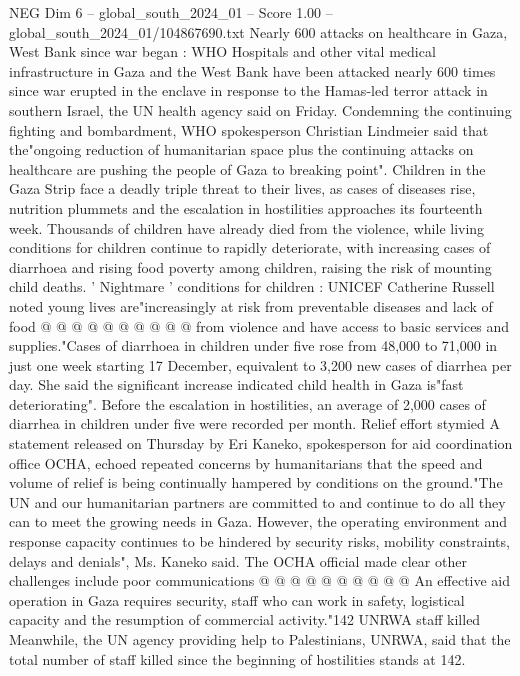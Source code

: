 \begin{textsample}{NEG Dim 6 – global\_south\_2024\_01 – Score 1.00 – global\_south\_2024\_01/104867690.txt}  \label{ex:f6_neg_353}
Nearly 600 attacks on healthcare in Gaza, West Bank since war began : WHO Hospitals and other vital medical infrastructure in Gaza and the West Bank have been attacked nearly 600 times since war erupted in the enclave in response to the Hamas-led terror attack in southern Israel, the UN health agency said on Friday.
Condemning the continuing fighting and bombardment, WHO spokesperson Christian Lindmeier said that the"ongoing reduction of humanitarian space plus the continuing attacks on healthcare are pushing the people of Gaza to breaking point".
Children in the Gaza Strip face a deadly triple threat to their lives, as cases of diseases rise, nutrition plummets and the escalation in hostilities approaches its fourteenth week.
Thousands of children have already died from the violence, while living conditions for children continue to rapidly deteriorate, with increasing cases of diarrhoea and rising food poverty among children, raising the risk of mounting child deaths. ' Nightmare ' conditions for children : UNICEF Catherine Russell noted young lives are"increasingly at risk from preventable diseases and lack of food @ @ @ @ @ @ @ @ @ @ from violence and have access to basic services and supplies."Cases of diarrhoea in children under five rose from 48,000 to 71,000 in just one week starting 17 December, equivalent to 3,200 new cases of diarrhea per day.
She said the significant increase indicated child health in Gaza is"fast deteriorating".
Before the escalation in hostilities, an average of 2,000 cases of diarrhea in children under five were recorded per month.
Relief effort stymied A statement released on Thursday by Eri Kaneko, spokesperson for aid coordination office OCHA, echoed repeated concerns by humanitarians that the speed and volume of relief is being continually hampered by conditions on the ground."The UN and our humanitarian partners are committed to and continue to do all they can to meet the growing needs in Gaza.
However, the operating environment and response capacity continues to be hindered by security risks, mobility constraints, delays and denials", Ms.
Kaneko said.
The OCHA official made clear other challenges include poor communications @ @ @ @ @ @ @ @ @ @ An effective aid operation in Gaza requires security, staff who can work in safety, logistical capacity and the resumption of commercial activity."142 UNRWA staff killed Meanwhile, the UN agency providing help to Palestinians, UNRWA, said that the total number of staff killed since the beginning of hostilities stands at 142.

\end{textsample}
